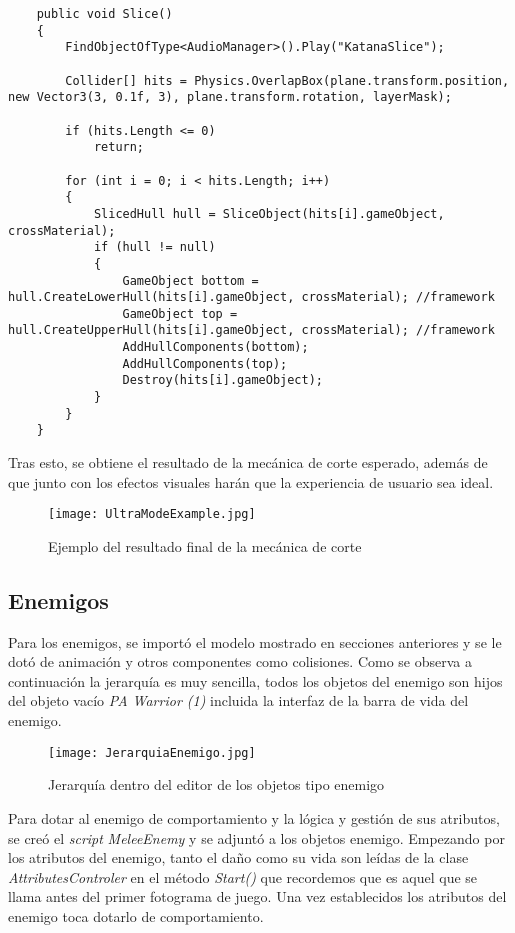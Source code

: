 \begin{lstlisting}
    public void Slice()
    {
        FindObjectOfType<AudioManager>().Play("KatanaSlice");

        Collider[] hits = Physics.OverlapBox(plane.transform.position, new Vector3(3, 0.1f, 3), plane.transform.rotation, layerMask);

        if (hits.Length <= 0)
            return;

        for (int i = 0; i < hits.Length; i++)
        {
            SlicedHull hull = SliceObject(hits[i].gameObject, crossMaterial);
            if (hull != null)
            {
                GameObject bottom = hull.CreateLowerHull(hits[i].gameObject, crossMaterial); //framework
                GameObject top = hull.CreateUpperHull(hits[i].gameObject, crossMaterial); //framework
                AddHullComponents(bottom);
                AddHullComponents(top);
                Destroy(hits[i].gameObject);
            }
        }
    }
\end{lstlisting}

Tras esto, se obtiene el resultado de la mecánica de corte esperado, además de que junto con los efectos visuales harán que la experiencia de usuario sea ideal.

\begin{figure}[H]
    \centering
    \texttt{[image: UltraModeExample.jpg]}
    \caption{Ejemplo del resultado final de la mecánica de corte}
\end{figure}

\subsection{Enemigos}

Para los enemigos, se importó el modelo mostrado en secciones anteriores y se le dotó de animación y otros componentes como colisiones. Como se observa a continuación la jerarquía es muy sencilla, todos los objetos del enemigo son hijos del objeto vacío \textit{PA Warrior (1)} incluida la interfaz de la barra de vida del enemigo.

\begin{figure}[H]
    \centering
    \texttt{[image: JerarquiaEnemigo.jpg]}
    \caption{Jerarquía dentro del editor de los objetos tipo enemigo}
\end{figure}

Para dotar al enemigo de comportamiento y la lógica y gestión de sus atributos, se creó el \textit{script} \textit{MeleeEnemy} y se adjuntó a los objetos enemigo. Empezando por los atributos del enemigo, tanto el daño como su vida son leídas de la clase \textit{AttributesControler} en el método \textit{Start()} que recordemos que es aquel que se llama antes del primer fotograma de juego. Una vez establecidos los atributos del enemigo toca dotarlo de comportamiento.


